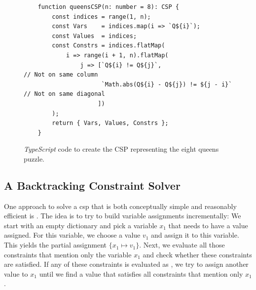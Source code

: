 \begin{figure}[!ht]
\centering
\begin{verbatim}
    function queensCSP(n: number = 8): CSP {
        const indices = range(1, n);
        const Vars    = indices.map(i => `Q${i}`);
        const Values  = indices;
        const Constrs = indices.flatMap(
            i => range(i + 1, n).flatMap(
                j => [`Q${i} != Q${j}`,                       // Not on same column
                      `Math.abs(Q${i} - Q${j}) != ${j - i}`   // Not on same diagonal
                     ])
        );
        return { Vars, Values, Constrs };
    }
\end{verbatim}
\vspace*{-0.3cm}
\caption{\textsl{TypeScript} code to create the CSP representing the eight queens puzzle.}
\label{fig:queens-csp.stlx}
\end{figure}


\subsection{A Backtracking Constraint Solver}
One approach to solve a \Gls{csp} that is both conceptually simple and reasonably efficient is
.  The idea is to try to build variable assignments incrementally:  We start with
an empty dictionary and pick a variable $x_1$ that needs to have a value assigned.  For this variable, we
choose a value $v_1$ and assign it to this variable.  This yields the partial assignment $\{ x_1 \mapsto v_1 \}$.
Next, we evaluate all those constraints that mention only the variable $x_1$ and check whether these constraints
are satisfied.  If any of these constraints is evaluated as , we try to assign another value to
$x_1$ until we find a value that satisfies all constraints that mention only $x_1$.

